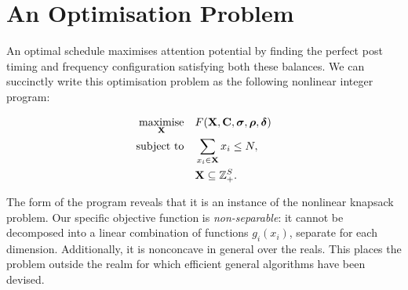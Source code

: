 \documentclass[onesided,asymmetric]{tufte-book}
\begin{document}
\newpage

\section{An Optimisation Problem}

An optimal schedule maximises attention potential by finding the perfect post timing and frequency configuration satisfying both these balances. We can succinctly write this optimisation problem as the following nonlinear integer program:

\begin{equation}
  \begin{aligned}
    \underset{\mathbf{X}\quad}{\text{maximise\quad}}& F(\mathbf{X}, \mathbf{C}, \boldsymbol\sigma, \boldsymbol\rho, \boldsymbol\delta)\\
    \text{subject to\quad}& \sum_{x_i \in \mathbf{X}} x_i \leq N, \\
                          & \mathbf{X} \subseteq \mathbb{Z}^S_+.\\
  \end{aligned}
\end{equation}

The form of the program reveals that it is an instance of the nonlinear knapsack problem\cite{bretthauer2002nonlinear}. Our specific objective function is \textit{non-separable}: it cannot be decomposed into a linear combination of functions $g_i(x_i)$, separate for each dimension. Additionally, it is nonconcave in general over the reals. This places the problem outside the realm for which efficient general algorithms have been devised.
\end{document}
